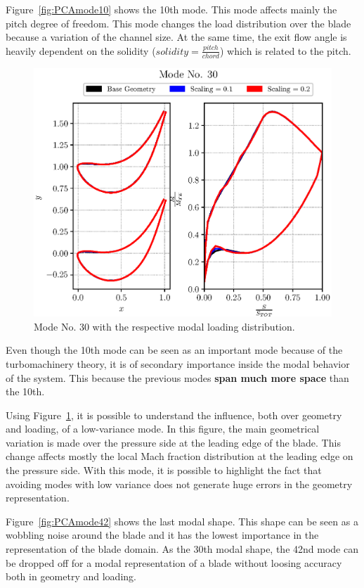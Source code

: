 Figure~\ref{fig:PCAmode10} shows the 10th mode. This mode affects mainly the pitch degree of freedom.
This mode changes the load distribution over the blade because a variation of the channel size. 
At the same time, the exit flow angle is heavily dependent on the solidity ($solidity = \frac{pitch}{chord}$) which is related to the pitch.

\begin{figure}[H]
    \centering
    \includegraphics[scale=\scaleBlade]{./images/mode30.eps}
    \caption{Mode No. 30 with the respective modal loading distribution.}
    \label{fig:PCAmode30}
\end{figure}

Even though the 10th mode can be seen as an important mode because of the turbomachinery theory, 
it is of secondary importance inside the modal behavior of the system. This because the previous modes
\textbf{span much more space} than the 10th.

Using Figure~\ref{fig:PCAmode30}, it is possible to understand the influence, both 
over geometry and loading, of a low-variance mode. In this figure, the main geometrical 
variation is made over the pressure side at the leading edge of the blade. This change 
affects mostly the local Mach fraction distribution at the leading edge on the pressure side.
With this mode, it is possible to highlight the fact that avoiding modes with low variance 
does not generate huge errors in the geometry representation.

Figure~\ref{fig:PCAmode42} shows the last modal shape. This shape can be seen as 
a wobbling noise around the blade and it has the lowest importance in the 
representation of the blade domain. As the 30th modal shape, the 42nd mode 
can be dropped off for a modal representation of a blade without loosing accuracy
both in geometry and loading.

